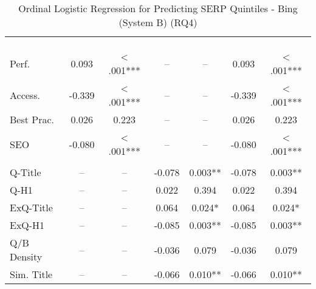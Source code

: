 \begin{table}[htbp!] 
\centering
\caption{Ordinal Logistic Regression for Predicting SERP Quintiles - Bing (System B) (RQ4)}
\label{app:rq4_regression_bing}
\small 
\setlength{\tabcolsep}{3pt}
\renewcommand{\arraystretch}{1}
\begin{threeparttable}
\begin{tabular*}{\textwidth}{l@{\extracolsep{\fill}} S[table-format=-1.3,table-space-text-post={***}] S[table-format=1.3,table-comparator=true,table-space-text-post={***}] S[table-format=-1.3,table-space-text-post={***}] S[table-format=1.3,table-comparator=true,table-space-text-post={***}] S[table-format=-1.3,table-space-text-post={***}] S[table-format=1.3,table-comparator=true,table-space-text-post={***}]}
\toprule
&  &  &  \\
\cmidrule(lr){2-3} \cmidrule(lr){4-5} \cmidrule(lr){6-7}
 & {} & {} & {} & {} & {} & {} \\
\dmidrule
{} & & & & & & \\
Perf. & 0.093 & < .001*** &  &  & 0.093 & < .001*** \\
Access. & -0.339 & < .001*** &  &  & -0.339 & < .001*** \\
Best Prac. & 0.026 & 0.223 &  &  & 0.026 & 0.223 \\
SEO & -0.080 & < .001*** &  &  & -0.080 & < .001*** \\
\midrule
{} & & & & & & \\
Q-Title &  &  & -0.078 & 0.003** & -0.078 & 0.003** \\
Q-H1 &  &  & 0.022 & 0.394 & 0.022 & 0.394 \\
ExQ-Title &  &  & 0.064 & 0.024* & 0.064 & 0.024* \\
ExQ-H1 &  &  & -0.085 & 0.003** & -0.085 & 0.003** \\
Q/B Density &  &  & -0.036 & 0.079 & -0.036 & 0.079 \\
Sim. Title &  &  & -0.066 & 0.010** & -0.066 & 0.010** \\

\end{tabular*}
\end{threeparttable}
\end{table}
